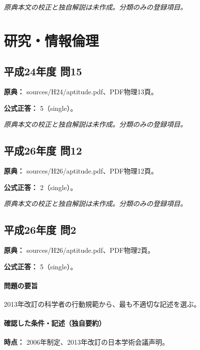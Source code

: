 \par\textit{原典本文の校正と独自解説は未作成。分類のみの登録項目。}

\section{研究・情報倫理}

\subsection{平成24年度 問15}
\label{q:h24-reg-apt-15}

\noindent\textbf{原典：} sources/H24/aptitude.pdf、PDF物理13頁。

\textbf{公式正答：} 5（single）。

\par\textit{原典本文の校正と独自解説は未作成。分類のみの登録項目。}

\subsection{平成26年度 問12}
\label{q:h26-reg-apt-12}

\noindent\textbf{原典：} sources/H26/aptitude.pdf、PDF物理12頁。

\textbf{公式正答：} 2（single）。

\par\textit{原典本文の校正と独自解説は未作成。分類のみの登録項目。}

\subsection{平成26年度 問2}
\label{q:h26-reg-apt-02}

\noindent\textbf{原典：} sources/H26/aptitude.pdf、PDF物理2頁。

\textbf{公式正答：} 5（single）。

\paragraph{問題の要旨} 2013年改訂の科学者の行動規範から、最も不適切な記述を選ぶ。

\paragraph{確認した条件・記述（独自要約）}\mbox{}\par

\noindent\textbf{時点：} 2006年制定、2013年改訂の日本学術会議声明。\par

